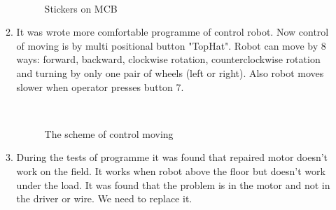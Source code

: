 \begin{enumerate}
\begin{enumerate}
\begin{figure}[H]
\begin{minipage}[h]{0.29\linewidth}
			\end{minipage}
			\hfill
			\begin{minipage}[h]{0.1\linewidth}
				\center  
			\end{minipage}
			\caption{Stickers on MCB}
		\end{figure}
		
        \item It was wrote more comfortable programme of control robot. Now control of moving is by multi positional button "TopHat". Robot can move by 8 ways: forward, backward, clockwise rotation, counterclockwise rotation and turning by only one pair of wheels (left or right). Also robot moves slower when operator presses button 7.
        \begin{figure}[H]
	  	  \begin{minipage}[h]{0.2\linewidth}
	  		\center  
	  	  \end{minipage}
	  	  \begin{minipage}[h]{0.6\linewidth}
	  		\caption{The scheme of control moving}
	  	  \end{minipage}
	   \end{figure}
	   
	   \item During the tests of programme it was found that repaired motor doesn't work on the field. It works when robot above the floor but doesn't work under the load. It was found that the problem is in the motor and not in the driver or wire. We need to replace it.
	   

\end{enumerate}
\end{enumerate}
